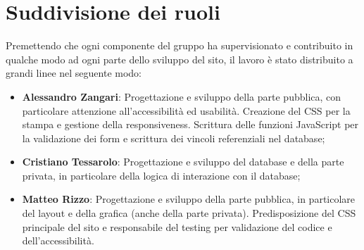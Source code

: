 \documentclass[12pt]{article}
\begin{document}
\newpage

	\section{Suddivisione dei ruoli}
	
	Premettendo che ogni componente del gruppo ha supervisionato e contribuito in qualche modo ad ogni parte dello sviluppo del sito, il lavoro è stato distribuito a grandi linee nel seguente modo:
	
	\begin{itemize}
		\item \textbf{Alessandro Zangari}: Progettazione e sviluppo della parte pubblica, con particolare attenzione all'accessibilità ed usabilità. Creazione del CSS per la stampa e gestione della responsiveness. Scrittura delle funzioni JavaScript per la validazione dei form e scrittura dei vincoli referenziali nel database;
		\item \textbf{Cristiano Tessarolo}: Progettazione e sviluppo del database e della parte privata, in particolare della logica di interazione con il database;
		\item \textbf{Matteo Rizzo}: Progettazione e sviluppo della parte pubblica, in particolare del layout e della grafica (anche della parte privata). Predisposizione del CSS principale del sito e responsabile del testing per validazione del codice e dell'accessibilità.
	\end{itemize}
	
\end{document}
